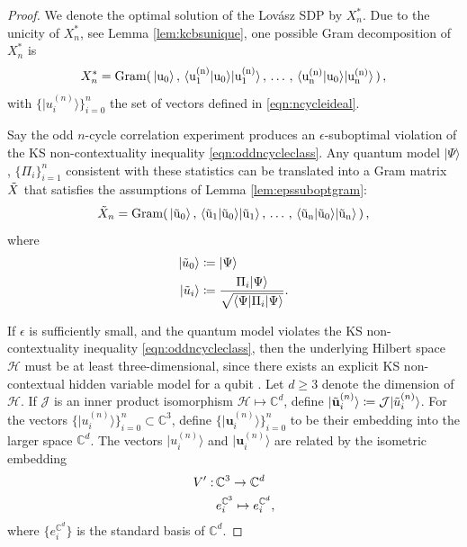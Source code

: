 \begin{proof} We denote the optimal solution of the Lovász SDP by $X^*_n$. Due to the unicity of $X_n^*$, see Lemma \ref{lem:kcbsunique}, one possible Gram decomposition of $X^*_n$ is
\begin{equation*}
X^*_n=\operatorname{Gram(\thinspace\vert u_0\rangle\thinspace,\thinspace \langle u_1^{(n)}\vert u_0 \rangle \vert u_1^{(n)}\rangle\thinspace,\thinspace \dots\thinspace,\thinspace \langle u_n^{(n)}\vert u_0\rangle \vert u_n^{(n)}\rangle\thinspace)}\thinspace,
\end{equation*}
with $\{\vert u_i^{(n)} \rangle \}_{i=0}^n$ the set of vectors defined in \ref{eqn:ncycleideal}.

Say the odd $n$-cycle correlation experiment produces an $\epsilon$-suboptimal violation of the KS non-contextuality inequality \ref{eqn:oddncycleclass}. Any quantum model $\vert \Psi \rangle$, $\{\Pi_i\}_{i=1}^n$ consistent with these statistics can be translated into a Gram matrix $\Tilde{X}$ that satisfies the assumptions of Lemma \ref{lem:epssuboptgram}:
\begin{equation*}
\Tilde{X}_n=\operatorname{Gram(\thinspace\vert \Tilde{u}_0\rangle\thinspace,\thinspace \langle \Tilde{u}_1\vert \Tilde{u}_0 \rangle \vert \Tilde{u}_1\rangle\thinspace,\thinspace \dots\thinspace,\thinspace \langle \Tilde{u}_n\vert \Tilde{u}_0\rangle \vert \Tilde{u}_n\rangle\thinspace)}\thinspace,
\end{equation*}
where 
\begin{align*}
    \vert \Tilde{u}_0 \rangle & \coloneqq \vert \Psi \rangle\\
    \vert  \Tilde{u}_i \rangle & \coloneqq \frac{\Pi_i \vert \Psi \rangle}{\sqrt{\langle \Psi \vert \Pi_i \vert \Psi \rangle}}.
\end{align*}

If $\epsilon$ is sufficiently small, and the quantum model violates the KS non-contextuality inequality \ref{eqn:oddncycleclass}, then the underlying Hilbert space $\mathcal{H}$ must be at least three-dimensional, since there exists an explicit KS non-contextual hidden variable model for a qubit \cite{Mermin1993}. Let $d\geq3$ denote the dimension of $\mathcal{H}$. If $\mathcal{J}$ is an inner product isomorphism $\mathcal{H}\mapsto\mathbb{C}^d$, define $\vert \Tilde{\mathbf{u}}_i^{(n)}\rangle \coloneqq \mathcal{J} \vert \Tilde{u}_i^{(n)}\rangle$.
For the vectors $\{\vert u_i^{(n)}\rangle \}_{i=0}^n\subset\mathbb{C}^3$, define $\{\vert \mathbf{u}_i^{(n)}\rangle \}_{i=0}^n$ to be their embedding into the larger space $\mathbb{C}^d$. The vectors $\vert u_i^{(n)}\rangle$ and $\vert \mathbf{u}_i^{(n)}\rangle$ are related by the isometric embedding 
\begin{align*}
    V':\thinspace & \mathbb{C}^3\rightarrow\mathbb{C}^d \\
    & e_i^{\mathbb{C}^3} \mapsto e_i^{\mathbb{C}^d},
\end{align*}
where $\{e_i^{\mathbb{C}^d}\}$ is the standard basis of $\mathbb{C}^d$.


\end{proof}
